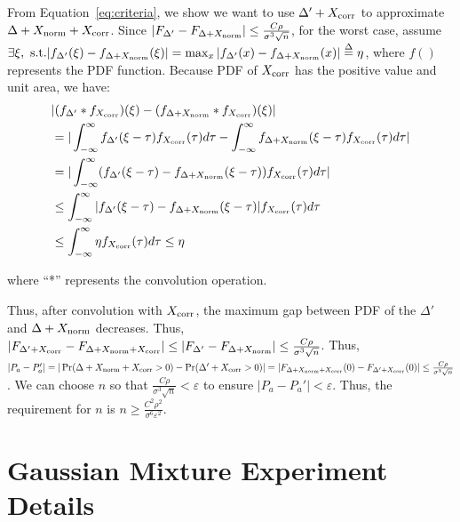 \documentclass{article}
\begin{document}
From Equation~\ref{eq:criteria}, we show we want to use $\Delta' + X_{\rm corr}$ to approximate $\Delta + X_{\rm norm} + X_{\rm corr}$. Since $|F_{\Delta'} - F_{\Delta + X_{\rm norm}}| \leq \frac{C\rho}{\sigma^3\sqrt{n}}$, for the worst case, assume $\exists \xi, ~{\rm s.t.} |f_{\Delta'}(\xi) - f_{\Delta + X_{\rm norm}} (\xi)| = \max_x |f_{\Delta'}(x) - f_{\Delta + X_{\rm norm}}(x)| \overset{\Delta}{=} \eta $, where $f()$ represents the PDF function. Because PDF of $X_{\rm corr}$ has the positive value and unit area, we have: 
\begin{align*} 
& |(f_{\Delta'}*f_{X_{\rm corr}})(\xi) - (f_{\Delta+X_{\rm norm}}*f_{X_{\rm corr}})(\xi)| \\
& = |\int_{-\infty}^{\infty}f_{\Delta'}(\xi-\tau)f_{X_{\rm corr}}(\tau)d\tau - \int_{-\infty}^{\infty}f_{\Delta + X_{\rm norm}} (\xi -\tau) f_{X_{\rm corr}} (\tau) d\tau| \\
& = |\int_{-\infty}^{\infty} (f_{\Delta'}(\xi-\tau) - f_{\Delta + X_{\rm norm}} (\xi -\tau)) f_{X_{\rm corr}} (\tau) d\tau| \\
& \leq \int_{-\infty}^{\infty} |f_{\Delta'}(\xi-\tau) - f_{\Delta + X_{\rm norm}} (\xi -\tau) |f_{X_{\rm corr}} (\tau) d\tau  \\
& \leq \int_{-\infty}^{\infty} \eta f_{X_{\rm corr}} (\tau) d\tau \leq \eta
\end{align*}

where ``*'' represents the convolution operation.

Thus, after convolution with $X_{\rm corr}$, the maximum gap between PDF of the $\Delta'$ and $\Delta + X_{\rm norm}$ decreases. Thus, $|F_{\Delta' + X_{\rm corr}} - F_{\Delta + X_{\rm norm} + X_{\rm corr}}| \leq |F_{\Delta'} - F_{\Delta + X_{\rm norm}}| \leq \frac{C\rho}{\sigma^3\sqrt{n}}$. Thus, $|P_a - P_a'| = |\Pr (\Delta + X_{\rm norm} + X_{\rm corr} > 0) - \Pr (\Delta' + X_{\rm corr} > 0)|=|F_{\Delta + X_{\rm norm} + X_{\rm corr}}(0) - F_{\Delta' + X_{\rm corr}}(0)| \leq \frac{C\rho}{\sigma^3\sqrt{n}}$. We can choose $n$ so that $\frac{C\rho}{\sigma^3\sqrt{n}} < \varepsilon$ to ensure $|P_a - P_a'| < \varepsilon$. Thus, the requirement for $n$ is $n \geq \frac{C^2\rho^2}{\sigma^6 \varepsilon^2}$.   



\section{Gaussian Mixture Experiment Details}\label{app:gaussian}
\end{document}
